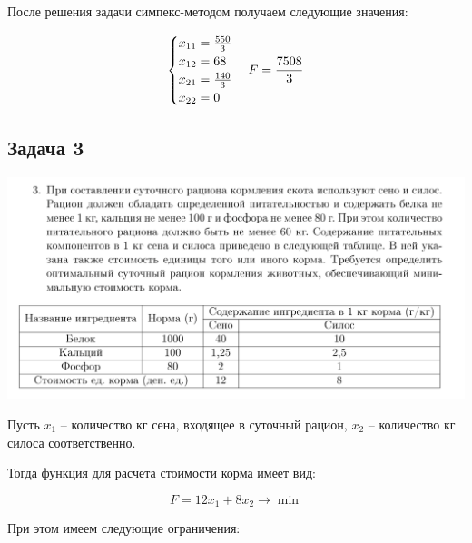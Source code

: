 \documentclass[11pt, a4paper]{article}
\begin{document}
    После решения задачи симпекс-методом получаем следующие значения:

    \begin{equation}
        \begin{cases}
            x_{11} = \frac{550}{3}\\
            x_{12} = 68\\
            x_{21} = \frac{140}{3}\\
            x_{22} = 0\\
        \end{cases}\label{eq:equation16}
        \newline
        F = \frac{7508}{3}
    \end{equation}

    \newpage

    \subsection{Задача 3}\label{subsec:task3}
    \includegraphics[width=1\textwidth]{docs/3}

    Пусть $x_1$ -- количество кг сена, входящее в суточный рацион,
    $x_2$ -- количество кг силоса соответственно.

    Тогда функция для расчета стоимости корма имеет вид:

    \begin{equation}
        F = 12x_1 + 8x_2 \rightarrow \min\label{eq:equation17}
    \end{equation}

    При этом имеем следующие ограничения:
\end{document}
